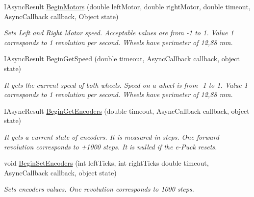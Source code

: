 \begin{DoxyCompactItemize}
  \item IAsyncResult \hyperlink{class_elib_1_1_epuck_aaa46f6da4226876036df7ba7cf2adca3}{BeginMotors} (double leftMotor, double rightMotor, double timeout, AsyncCallback callback, Object state)
  \begin{DoxyCompactList}\small\item\em Sets Left and Right Motor speed. Acceptable values are from -\/1 to 1. Value 1 corresponds to 1 revolution per second. Wheels have perimeter of 12,88 mm. \item\end{DoxyCompactList}

  \item   IAsyncResult \hyperlink{class_elib_1_1_epuck_a26cd19a983186a23aa49d99106bd33d1}{BeginGetSpeed} (double timeout, AsyncCallback callback, object state)
  \begin{DoxyCompactList}\small\item\em It gets the current speed of both wheels. Speed on a wheel is from -\/1 to 1. Value 1 corresponds to 1 revolution per second. Wheels have perimeter of 12,88 mm. \item\end{DoxyCompactList}

  \item  IAsyncResult \hyperlink{class_elib_1_1_epuck_ad4cfe3776708816e78a7c53ddde315fb}{BeginGetEncoders} (double timeout, AsyncCallback callback, object state)
  \begin{DoxyCompactList}\small\item\em It gets a current state of encoders. It is measured in steps. One forward revolution corresponds to +1000 steps.
  It is nulled if the e-\/Puck resets. \item\end{DoxyCompactList}

  \item void \hyperlink{class_elib_1_1_epuck_a8b0942a1bbf1b78115b0eedf77e535a0}{BeginSetEncoders} (int leftTicks, int rightTicks double timeout, AsyncCallback callback, object state)
  \begin{DoxyCompactList}\small\item\em Sets encoders values. One revolution corresponds to 1000 steps. \item\end{DoxyCompactList}

  \end{DoxyCompactItemize}

